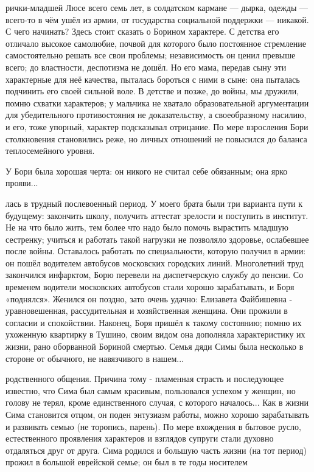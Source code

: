 рички-младшей Люсе всего семь лет, в солдатском кармане — дырка, одежды — всего-то в чём ушёл из армии, от государства социальной поддержки — никакой. С чего начинать? Здесь стоит сказать о Борином характере. С детства его отличало высокое самолюбие, почвой для которого было постоянное стремление самостоятельно решать все свои проблемы; независимость он ценил превыше всего; до властности, деспотизма не дошёл. Но его мама, передав сыну эти характерные для неё качества, пыталась бороться с ними в сыне: она пыталась подчинить его своей сильной воле. В детстве и позже, до войны, мы дружили, помню схватки характеров; у мальчика не хватало образовательной аргументации для убедительного противостояния не доказательству, а своеобразному насилию, и его, тоже упорный, характер подсказывал отрицание. По мере взросления Бори столкновения становились реже, но личных отношений не повысился до баланса теплосемейного уровня.

У Бори была хорошая черта: он никого не считал себе обязанным; она ярко прояви...

лась в трудный послевоенный период. У моего брата были три варианта пути к будущему: закончить школу, получить аттестат зрелости и поступить в институт. Не на что было жить, тем более что надо было помочь вырастить младшую сестренку; учиться и работать такой нагрузки не позволяло здоровье, ослабевшее после войны. Оставалось работать по специальности, которую получил в армии: он пошёл водителем автобусов московских городских линий. Многолетний труд закончился инфарктом, Борю перевели на диспетчерскую службу до пенсии. Со временем водители московских автобусов стали хорошо зарабатывать, и Боря «поднялся». Женился он поздно, зато очень удачно: Елизавета Файбишевна - уравновешенная, рассудительная и хозяйственная женщина. Они прожили в согласии и спокойствии. Наконец, Боря пришёл к такому состоянию; помню их ухоженную квартирку в Тушино, своим видом она дополняла характеристику их жизни, рано оборванной Бориной смертью. Семья дяди Симы была несколько в стороне от обычного, не навязчивого в нашем...

родственного общения. Причина тому - пламенная страсть и последующее известно, что Сима был самым красивым, пользовался успехом у женщин, но голову не терял, кроме единственного случая, с которого началось... Как в жизни Сима становится отцом, он поден энтузиазм работы, можно хорошо зарабатывать и развивать семью (не торопись, парень). По мере вхождения в бытовое русло, естественного проявления характеров и взглядов супруги стали духовно отдаляться друг от друга. Сима родился и большую часть жизни (на тот период) прожил в большой еврейской семье; он был в те годы носителем

